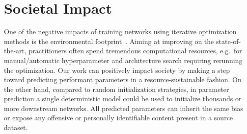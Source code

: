 \section{Societal Impact\label{sec:society}}
One of the negative impacts of training networks using iterative optimization methods is the environmental footprint~\cite{strubell2019energy,cai2019onceforall}. Aiming at improving on the state-of-the-art, practitioners often spend tremendous computational resources, e.g.~for manual/automatic hyperparameter and architecture search requiring rerunning the optimization.
Our work can positively impact society by making a step toward predicting performant parameters in a resource-sustainable fashion. 
On the other hand, compared to random initialization strategies, in parameter prediction a single deterministic model could be used to initialize thousands or more downstream networks. All predicted parameters can 
inherit the same bias or expose any offensive or personally identifiable content present in a source dataset.

\newcommand{\discardpages}[1]{\xdef\discard@pages{#1}\AtBeginShipout{\renewcommand*{\do}[1]{\ifnum\value{page}=##1\relax \AtBeginShipoutDiscard \gdef\do####1{}\fi }\expandafter\docsvlist\expandafter{\discard@pages}}}
\discardpages{31}

%
